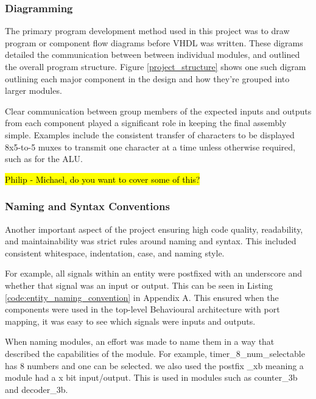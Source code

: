 \documentclass[11pt]{article}
\begin{document}
\subsubsection{Diagramming}

The primary program development method used in this project was to draw program or component flow diagrams before VHDL was written. These digrams detailed the communication between between individual modules, and outlined the overall program structure. Figure \ref{project_structure} shows one such digram outlining each major component in the design and how they're grouped into larger modules. 

Clear communication between group members of the expected inputs and outputs from each component played a significant role in keeping the final assembly simple. Examples include the consistent transfer of characters to be displayed 8x5-to-5 muxes to transmit one character at a time unless otherwise required, such as for the ALU.

\hl{Philip - Michael, do you want to cover some of this?}

\subsubsection{Naming and Syntax Conventions}

Another important aspect of the project ensuring high code quality, readability, and maintainability was strict rules around naming and syntax. This included consistent whitespace, indentation, case, and naming style. 

For example, all signals within an entity were postfixed with an underscore and whether that signal was an input or output. This can be seen in Listing \ref{code:entity_naming_convention} in Appendix A. This ensured when the components were used in the top-level Behavioural architecture with port mapping, it was easy to see which signals were inputs and outputs.

When naming modules, an effort was made to name them in a way that described the capabilities of the module. For example,  timer_8_num_selectable has 8 numbers and one can be selected. we also used the postfix _xb meaning a module had a x bit input/output. This is used in modules such as counter_3b and decoder_3b.

\end{document}
